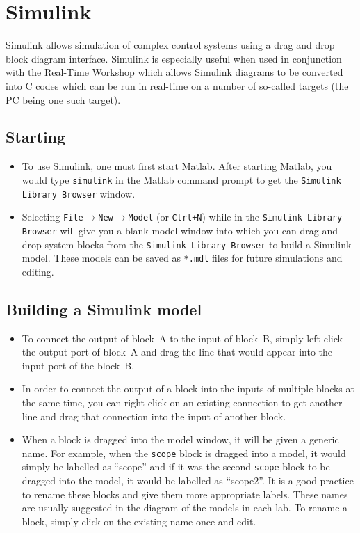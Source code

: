 \chapter{Simulink}\label{chap:simulink}

\textsf{Simulink} allows simulation of complex control systems using a drag
and drop block diagram interface.  \textsf{Simulink} is especially useful
when used in conjunction with the Real-Time Workshop which allows
\textsf{Simulink} diagrams to be converted into C codes which can be run in
real-time on a number of so-called targets (the PC being one such target).

\section{Starting}

\begin{itemize}
\item To use \textsf{Simulink}, one must first start \textsf{Matlab}.  After
starting \textsf{Matlab}, you would type \verb|simulink| in the
\textsf{Matlab} command prompt to get the \verb|Simulink Library Browser|
window.

\item Selecting \verb|File|$\to$\verb|New|$\to$\verb|Model| (or
\verb|Ctrl+N|) while in the \verb|Simulink Library Browser| will give you a
blank model window into which you can drag-and-drop system blocks from the
\verb|Simulink Library Browser| to build a \textsf{Simulink} model.  These
models can be saved as \verb|*.mdl| files for future simulations and editing.
\end{itemize}

\section{Building a \textsf{Simulink} model}

\begin{itemize}
\item To connect the output of block~A to the input of block~B, simply
left-click the output port of block~A and drag the line that would appear
into the input port of the block~B.

\item In order to connect the output of a block into the inputs of multiple
blocks at the same time, you can right-click on an existing connection to get
another line and drag that connection into the input of another block.

\item When a block is dragged into the model window, it will be given a
generic name.  For example, when the \verb|scope| block is dragged into a
model, it would simply be labelled as ``scope'' and if it was the second
\verb|scope| block to be dragged into the model, it would be labelled as
``scope2''.  It is a good practice to rename these blocks and give them more
appropriate labels.  These names are usually suggested in the diagram of the
models in each lab. To rename a block, simply click on the existing name once
and edit.
\end{itemize}

